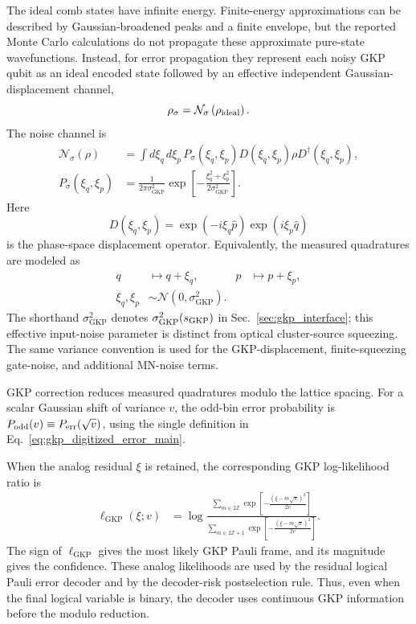 \documentclass[aps,
prx,
superscriptaddress,
reprint,
longbibliography,
floatfix]{revtex4-2}
\newcommand{\GKP}{\mathrm{GKP}}
\begin{document}
The ideal comb states have infinite energy. Finite-energy approximations can be described by Gaussian-broadened peaks and a finite envelope, but the reported Monte Carlo calculations do not propagate these approximate pure-state wavefunctions. Instead, for error propagation they represent each noisy GKP qubit as an ideal encoded state followed by an effective independent Gaussian-displacement channel,
\begin{equation}
 \rho_{\sigma}
 =
 \mathcal{N}_{\sigma}
 \left(\rho_{\rm ideal}\right).
 \label{eq:appA_gkp_finite_energy_channel}
\end{equation}
The noise channel is
\begin{align}
 \mathcal{N}_{\sigma}(\rho)
 &=
 \int d\xi_q\,d\xi_p\,
 P_{\sigma}(\xi_q,\xi_p)
 D(\xi_q,\xi_p)
 \rho
 D^{\dagger}(\xi_q,\xi_p),
 \label{eq:appA_gkp_random_displacement_channel}\\
 P_{\sigma}(\xi_q,\xi_p)
 &=
 \frac{1}{2\pi\sigma_{\GKP}^2}
 \exp\!\left[
 -\frac{\xi_q^2+\xi_p^2}
 {2\sigma_{\GKP}^2}
 \right].
 \label{eq:appA_gkp_gaussian_noise_distribution}
\end{align}
Here
\begin{equation}
 D(\xi_q,\xi_p)
 =
 \exp(-i\xi_q\hat p)
 \exp(i\xi_p\hat q)
 \label{eq:appA_gkp_displacement_operator}
\end{equation}
is the phase-space displacement operator. Equivalently, the measured quadratures are modeled as
\begin{align}
 q &\mapsto q+\xi_q,
 &
 p &\mapsto p+\xi_p,
 \label{eq:appA_gkp_gaussian_shift_model}\\
 \xi_q,\xi_p
 &\sim
 \mathcal{N}(0,\sigma_{\GKP}^2).
 \nonumber
\end{align}
The shorthand $\sigma_{\GKP}^2$ denotes $\sigma_{\GKP}^2(s_{\rm GKP})$ in Sec.~\ref{sec:gkp_interface}; this effective input-noise parameter is distinct from optical cluster-source squeezing. The same variance convention is used for the GKP-displacement, finite-squeezing gate-noise, and additional MN-noise terms.

GKP correction reduces measured quadratures modulo the lattice spacing. For a scalar Gaussian shift of variance $v$, the odd-bin error probability is $P_{\rm odd}(v)\equiv P_{\rm err}(\sqrt v)$, using the single definition in Eq.~\eqref{eq:gkp_digitized_error_main}.

When the analog residual \(\xi\) is retained, the corresponding GKP log-likelihood ratio is
\begin{align}
 \ell_{\GKP}(\xi;v)
 &=
 \log
 \frac{
 \displaystyle
 \sum_{m\in 2\mathbb{Z}}
 \exp\!\left[
 -\frac{(\xi-m\sqrt{\pi})^2}{2v}
 \right]
 }{
 \displaystyle
 \sum_{m\in 2\mathbb{Z}+1}
 \exp\!\left[
 -\frac{(\xi-m\sqrt{\pi})^2}{2v}
 \right]
 }.
 \label{eq:appA_gkp_llr}
\end{align}
The sign of \(\ell_{\GKP}\) gives the most likely GKP Pauli frame, and its magnitude gives the confidence. These analog likelihoods are used by the residual logical Pauli error decoder and by the decoder-risk postselection rule. Thus, even when the final logical variable is binary, the decoder uses continuous GKP information before the modulo reduction.
\end{document}

